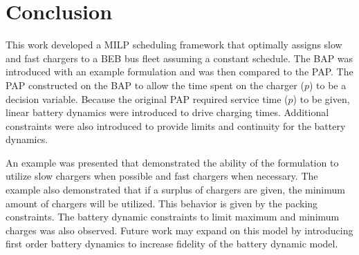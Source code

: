 \documentclass[letterpaper, 10pt, conference]{IEEEtran}
\begin{document}
\section{Conclusion}
\label{sec:conclusion}
This work developed a MILP scheduling framework that optimally assigns slow and fast chargers to a BEB bus fleet assuming a constant schedule. The BAP was introduced with an example formulation and was then compared to the PAP. The PAP constructed on the BAP to allow the time spent on the charger (\(p\)) to be a decision variable. Because the original PAP required service time (\(p\)) to be given, linear battery dynamics were introduced to drive charging times. Additional constraints were also introduced to provide limits and continuity for the battery dynamics.

An example was presented that demonstrated the ability of the formulation to utilize slow chargers when possible and fast chargers when necessary. The example also demonstrated that if a surplus of chargers are given, the minimum amount of chargers will be utilized. This behavior is given by the packing constraints. The battery dynamic constraints to limit maximum and minimum charges was also observed. Future work may expand on this model by introducing first order battery dynamics to increase fidelity of the battery dynamic model.




\end{document}
